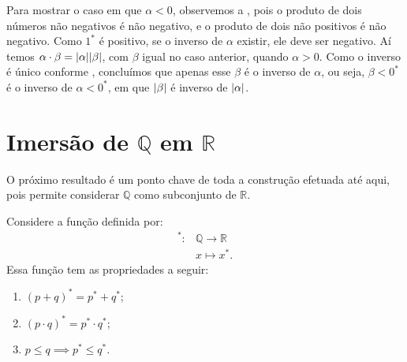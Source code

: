 \documentclass[../main.tex]{subfiles}
\begin{document}
\begin{dem}
    Para mostrar o caso em que $\alpha < 0$, observemos a , pois o produto de dois números não negativos é não negativo, e o produto de dois não positivos é não negativo. Como $1^*$ é positivo, se o inverso de $\alpha$ existir, ele deve ser negativo. Aí temos 
    $\alpha \cdot \beta = \abs{\alpha} \abs{\beta}$, com $\beta$ igual no caso anterior, quando $\alpha > 0$. Como o inverso é único conforme , concluímos que apenas esse $\beta$ é o inverso de $\alpha$, ou seja, $\beta < 0^*$ é o inverso de $\alpha < 0^*$, em que $\abs{\beta}$ é inverso de $\abs{\alpha}$.
    
\end{dem}


\section{Imersão de $\mathbb{Q}$ em $\mathbb{R}$}
O próximo resultado é um ponto chave de toda a construção efetuada até aqui, pois permite considerar $\mathbb{Q}$ como subconjunto de $\mathbb{R}$.
\begin{teo}\label{reais-teo-imersao}
    Considere a função definida por:
    \begin{align*}
        ^* \colon &\mathbb{Q} \to \mathbb{R} \\
        &x \mapsto x^*.
    \end{align*}
    Essa função tem as propriedades a seguir:
    \begin{enumerate}[label=(\roman*)]
        \item $(p + q)^* = p^* + q^*$;
        \item $(p \cdot q)^* = p^* \cdot q^*$;
        \item $p \leq q \implies p^* \leq q^*$.
    \end{enumerate}
\end{teo}
\end{document}
